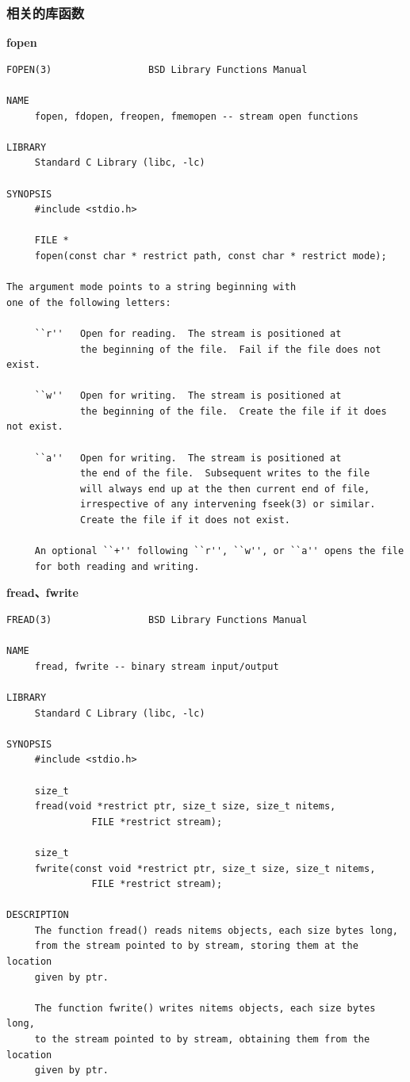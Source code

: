 \subsubsection{相关的库函数}
\textbf{fopen}
\begin{lstlisting}
FOPEN(3)                 BSD Library Functions Manual  

NAME
     fopen, fdopen, freopen, fmemopen -- stream open functions

LIBRARY
     Standard C Library (libc, -lc)

SYNOPSIS
     #include <stdio.h>

     FILE *
     fopen(const char * restrict path, const char * restrict mode);

The argument mode points to a string beginning with 
one of the following letters:

     ``r''   Open for reading.  The stream is positioned at
             the beginning of the file.  Fail if the file does not exist.

     ``w''   Open for writing.  The stream is positioned at 
             the beginning of the file.  Create the file if it does not exist.

     ``a''   Open for writing.  The stream is positioned at 
             the end of the file.  Subsequent writes to the file 
             will always end up at the then current end of file, 
             irrespective of any intervening fseek(3) or similar.  
             Create the file if it does not exist.

     An optional ``+'' following ``r'', ``w'', or ``a'' opens the file 
     for both reading and writing.
\end{lstlisting}
\textbf{fread、fwrite}
\begin{lstlisting}
FREAD(3)                 BSD Library Functions Manual 

NAME
     fread, fwrite -- binary stream input/output

LIBRARY
     Standard C Library (libc, -lc)

SYNOPSIS
     #include <stdio.h>

     size_t
     fread(void *restrict ptr, size_t size, size_t nitems, 
               FILE *restrict stream);

     size_t
     fwrite(const void *restrict ptr, size_t size, size_t nitems, 
               FILE *restrict stream);

DESCRIPTION
     The function fread() reads nitems objects, each size bytes long,
     from the stream pointed to by stream, storing them at the location
     given by ptr.

     The function fwrite() writes nitems objects, each size bytes long, 
     to the stream pointed to by stream, obtaining them from the location
     given by ptr.


\end{lstlisting}
